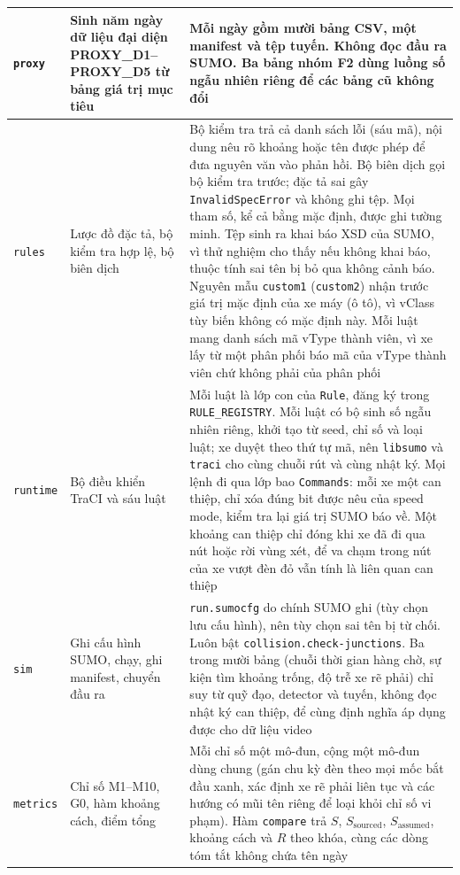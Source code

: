 \documentclass[../DoAn.tex]{subfiles}
\begin{document}
\begin{longtable}{|p{2.3cm}|p{4.2cm}|p{7.5cm}|}
\texttt{proxy} & Sinh năm ngày dữ liệu đại diện PROXY\_D1--PROXY\_D5 từ bảng giá trị mục tiêu & Mỗi ngày gồm mười bảng CSV, một manifest và tệp tuyến. Không đọc đầu ra SUMO. Ba bảng nhóm F2 dùng luồng số ngẫu nhiên riêng để các bảng cũ không đổi \\ \hline
\texttt{rules} & Lược đồ đặc tả, bộ kiểm tra hợp lệ, bộ biên dịch & Bộ kiểm tra trả cả danh sách lỗi (sáu mã), nội dung nêu rõ khoảng hoặc tên được phép để đưa nguyên văn vào phản hồi. Bộ biên dịch gọi bộ kiểm tra trước; đặc tả sai gây \texttt{InvalidSpecError} và không ghi tệp. Mọi tham số, kể cả bằng mặc định, được ghi tường minh. Tệp sinh ra khai báo XSD của SUMO, vì thử nghiệm cho thấy nếu không khai báo, thuộc tính sai tên bị bỏ qua không cảnh báo. Nguyên mẫu \texttt{custom1} (\texttt{custom2}) nhận trước giá trị mặc định của xe máy (ô tô), vì vClass tùy biến không có mặc định này. Mỗi luật mang danh sách mã vType thành viên, vì xe lấy từ một phân phối báo mã của vType thành viên chứ không phải của phân phối \\ \hline
\texttt{runtime} & Bộ điều khiển TraCI và sáu luật & Mỗi luật là lớp con của \texttt{Rule}, đăng ký trong \texttt{RULE\_REGISTRY}. Mỗi luật có bộ sinh số ngẫu nhiên riêng, khởi tạo từ seed, chỉ số và loại luật; xe duyệt theo thứ tự mã, nên \texttt{libsumo} và \texttt{traci} cho cùng chuỗi rút và cùng nhật ký. Mọi lệnh đi qua lớp bao \texttt{Commands}: mỗi xe một can thiệp, chỉ xóa đúng bit được nêu của speed mode, kiểm tra lại giá trị SUMO báo về. Một khoảng can thiệp chỉ đóng khi xe đã đi qua nút hoặc rời vùng xét, để va chạm trong nút của xe vượt đèn đỏ vẫn tính là liên quan can thiệp \\ \hline
\texttt{sim} & Ghi cấu hình SUMO, chạy, ghi manifest, chuyển đầu ra & \texttt{run.sumocfg} do chính SUMO ghi (tùy chọn lưu cấu hình), nên tùy chọn sai tên bị từ chối. Luôn bật \texttt{collision.check-junctions}. Ba trong mười bảng (chuỗi thời gian hàng chờ, sự kiện tìm khoảng trống, độ trễ xe rẽ phải) chỉ suy từ quỹ đạo, detector và tuyến, không đọc nhật ký can thiệp, để cùng định nghĩa áp dụng được cho dữ liệu video \\ \hline
\texttt{metrics} & Chỉ số M1--M10, G0, hàm khoảng cách, điểm tổng & Mỗi chỉ số một mô-đun, cộng một mô-đun dùng chung (gán chu kỳ đèn theo mọi mốc bắt đầu xanh, xác định xe rẽ phải liên tục và các hướng có mũi tên riêng để loại khỏi chỉ số vi phạm). Hàm \texttt{compare} trả $S$, $S_{\text{sourced}}$, $S_{\text{assumed}}$, khoảng cách và $R$ theo khóa, cùng các dòng tóm tắt không chứa tên ngày \\ \hline

\end{longtable}
\end{document}
